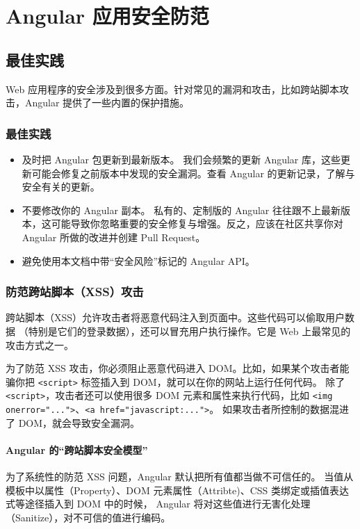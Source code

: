 \documentclass{progbookcn}
\begin{document}
\part{Angular 应用安全防范}


\chapter{最佳实践}

Web 应用程序的安全涉及到很多方面。针对常见的漏洞和攻击，比如跨站脚本攻击，Angular 提供了一些内置的保护措施。

\section{最佳实践}

\begin{itemize}
  \item 及时把 Angular 包更新到最新版本。 我们会频繁的更新 Angular 库，这些更新可能会修复之前版本中发现的安全漏洞。查看 Angular 的更新记录，了解与安全有关的更新。
  \item 不要修改你的 Angular 副本。 私有的、定制版的 Angular 往往跟不上最新版本，这可能导致你忽略重要的安全修复与增强。反之，应该在社区共享你对 Angular 所做的改进并创建 Pull Request。
  \item 避免使用本文档中带``安全风险''标记的 Angular API。
\end{itemize}

\section{防范跨站脚本（XSS）攻击}

跨站脚本（XSS）允许攻击者将恶意代码注入到页面中。这些代码可以偷取用户数据 （特别是它们的登录数据），还可以冒充用户执行操作。它是 Web 上最常见的攻击方式之一。

为了防范 XSS 攻击，你必须阻止恶意代码进入 DOM。比如，如果某个攻击者能骗你把 \verb|<script>| 标签插入到 DOM，就可以在你的网站上运行任何代码。 除了 \verb|<script>|，攻击者还可以使用很多 DOM 元素和属性来执行代码，比如 \verb|<img onerror="...">|、\verb|<a href="javascript:...">|。 如果攻击者所控制的数据混进了 DOM，就会导致安全漏洞。

\subsection{Angular 的``跨站脚本安全模型''}

为了系统性的防范 XSS 问题，Angular 默认把所有值都当做不可信任的。 当值从模板中以属性（Property）、DOM 元素属性（Attribte)、CSS 类绑定或插值表达式等途径插入到 DOM 中的时候， Angular 将对这些值进行无害化处理（Sanitize），对不可信的值进行编码。
\end{document}
